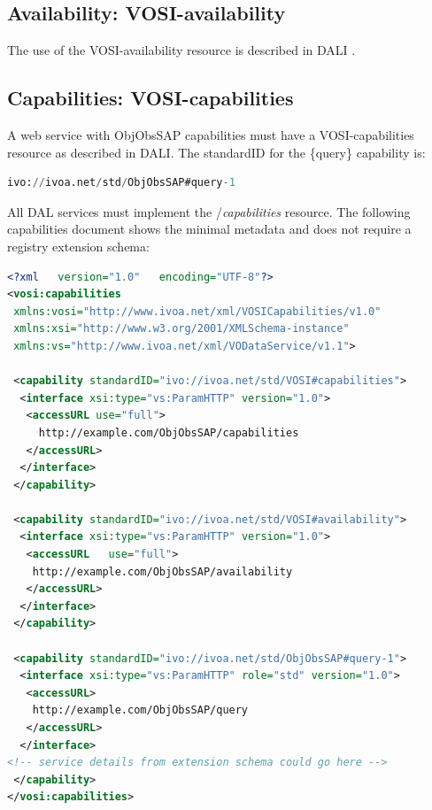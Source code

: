 \documentclass[11pt,a4paper]{ivoatex/ivoa}
\begin{document}
\subsection{Availability: VOSI-availability}
The use of the VOSI-availability resource is described in DALI \citep{2017ivoa.spec.0517D}.


\subsection{Capabilities: VOSI-capabilities}
A web service with ObjObsSAP capabilities must have a VOSI-capabilities
resource as described in DALI. The standardID for the \{query\}
capability is:

\begin{lstlisting}[language=SQL]
ivo://ivoa.net/std/ObjObsSAP#query-1
\end{lstlisting}
All DAL services must implement the /\textit{capabilities} resource.
The following capabilities document shows the minimal metadata and does
not require a registry extension schema:

\begin{lstlisting}[language=XML]
<?xml	version="1.0"	encoding="UTF-8"?>
<vosi:capabilities
 xmlns:vosi="http://www.ivoa.net/xml/VOSICapabilities/v1.0"
 xmlns:xsi="http://www.w3.org/2001/XMLSchema-instance"
 xmlns:vs="http://www.ivoa.net/xml/VODataService/v1.1">
 
 <capability standardID="ivo://ivoa.net/std/VOSI#capabilities">
  <interface xsi:type="vs:ParamHTTP" version="1.0">
   <accessURL use="full">
     http://example.com/ObjObsSAP/capabilities
   </accessURL>
  </interface>
 </capability>

 <capability standardID="ivo://ivoa.net/std/VOSI#availability">
  <interface xsi:type="vs:ParamHTTP" version="1.0">
   <accessURL	use="full">
    http://example.com/ObjObsSAP/availability
   </accessURL>
  </interface>
 </capability>

 <capability standardID="ivo://ivoa.net/std/ObjObsSAP#query-1">
  <interface xsi:type="vs:ParamHTTP" role="std"	version="1.0">
   <accessURL>
    http://example.com/ObjObsSAP/query
   </accessURL>
  </interface>
<!-- service details from extension schema could go here -->
 </capability>
</vosi:capabilities>

\end{lstlisting}
\end{document}
